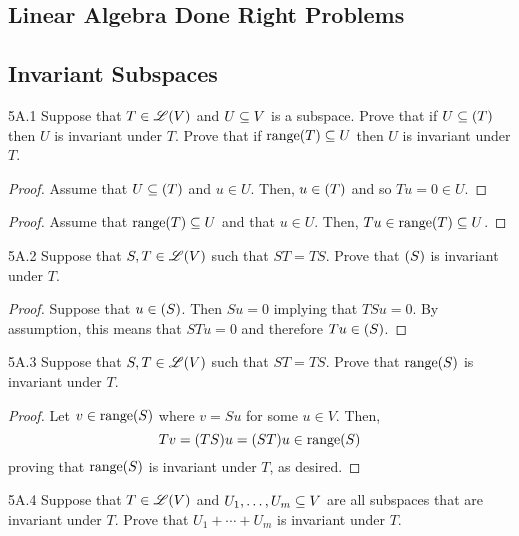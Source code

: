 \documentclass[../AlgebraQualSolutions.tex]{subfiles}
\begin{document}
\subsection{Linear Algebra Done Right Problems}

\subsection{Invariant Subspaces}
\begin{LA}{5A.1}{}
Suppose that $T \in \mathscr{L}(V)$ and $U \subseteq V$ is a subspace. Prove that if $U \sq \null(T)$ then $U$ is invariant under $T$. Prove that if $\mathrm{range}(T) \subseteq U$ then $U$ is invariant under $T$.
\end{LA}

\begin{proof}
Assume that $U \sq \null(T)$ and $u \in U$. Then, $u \in \null(T)$ and so $Tu = 0 \in U$.
\end{proof}

\begin{proof}
Assume that $\mathrm{range}(T) \subseteq U$ and that $u \in U$. Then, $Tu \in \mathrm{range}(T) \subseteq U$.
\end{proof}

\begin{LA}{5A.2}{}
Suppose that $S,T \in \mathscr{L}(V)$ such that $ST = TS$. Prove that $\null(S)$ is invariant under $T$.
\end{LA}

\begin{proof}
Suppose that $u \in \null(S)$. Then $S u = 0$ implying that $TS u = 0$. By assumption, this means that $STu = 0$ and therefore $Tu \in \null(S)$.
\end{proof}

\begin{LA}{5A.3}{}
Suppose that $S,T \in \mathscr{L}(V)$ such that $ST = TS$. Prove that $\mathrm{range}(S)$ is invariant under $T$.
\end{LA}

\begin{proof}
Let $v \in \mathrm{range}(S)$ where $v = Su$ for some $u \in V$. Then,
	\[Tv = (TS) u = (ST)u \in \mathrm{range}(S) \]
proving that $\mathrm{range}(S)$ is invariant under $T$, as desired.
\end{proof}

\begin{LA}{5A.4}{}
Suppose that $T \in \mathscr{L}(V)$ and $U_1, \ldots, U_m \subseteq V$ are all subspaces that are invariant under $T$. Prove that $U_1 + \cdots + U_m$ is invariant under $T$.
\end{LA}
\end{document}
